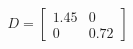 \documentclass[preview]{standalone}
\begin{document}
\begin{align*}
D=\begin{bmatrix}1.45&0\\0&0.72\end{bmatrix}
\end{align*}
\end{document}
